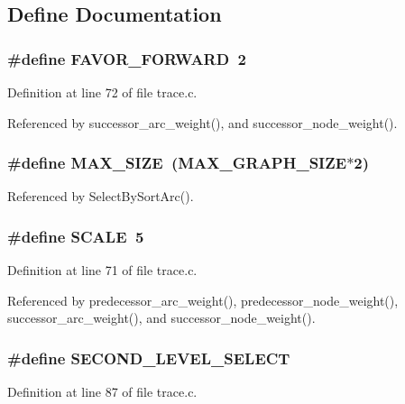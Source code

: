 \subsection{Define Documentation}
\subsubsection{\setlength{\rightskip}{0pt plus 5cm}\#define FAVOR\_\-FORWARD~2}\label{trace_8c_099f546dcb68fe36218bb8567d2fef2d}




Definition at line 72 of file trace.c.

Referenced by successor\_\-arc\_\-weight(), and successor\_\-node\_\-weight().
\subsubsection{\setlength{\rightskip}{0pt plus 5cm}\#define MAX\_\-SIZE~(MAX\_\-GRAPH\_\-SIZE$\ast$2)}\label{trace_8c_0592dba56693fad79136250c11e5a7fe}




Referenced by Select\-By\-Sort\-Arc().
\subsubsection{\setlength{\rightskip}{0pt plus 5cm}\#define SCALE~5}\label{trace_8c_0cbea62f1ce2043dd08108e65ed8de1d}




Definition at line 71 of file trace.c.

Referenced by predecessor\_\-arc\_\-weight(), predecessor\_\-node\_\-weight(), successor\_\-arc\_\-weight(), and successor\_\-node\_\-weight().
\subsubsection{\setlength{\rightskip}{0pt plus 5cm}\#define SECOND\_\-LEVEL\_\-SELECT}\label{trace_8c_dd3c59314c3e62ab67401dbf83b5b5ec}




Definition at line 87 of file trace.c.

